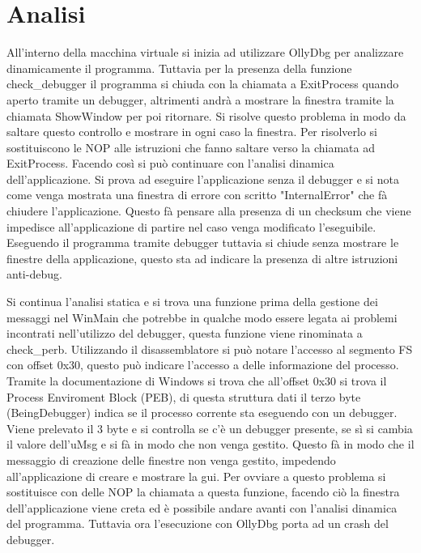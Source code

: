 \documentclass[a4paper,10pt]{article}
\begin{document}
\section{Analisi}
All'interno della macchina virtuale si inizia ad utilizzare OllyDbg per analizzare dinamicamente il programma. Tuttavia per la presenza della funzione check\_debugger il programma si chiuda con la chiamata a ExitProcess quando aperto tramite un debugger, altrimenti andrà a mostrare la finestra tramite la chiamata ShowWindow per poi ritornare. Si risolve questo problema in modo da saltare questo controllo e mostrare in ogni caso la finestra. Per risolverlo si sostituiscono le NOP alle istruzioni che fanno saltare verso la chiamata ad ExitProcess.
 Facendo così si può continuare con l'analisi dinamica dell'applicazione. Si prova ad eseguire l'applicazione senza il debugger e si nota come venga mostrata una finestra di errore con scritto "InternalError" che fà chiudere l'applicazione. Questo fà pensare alla presenza di un checksum che viene impedisce all'applicazione di partire nel caso venga modificato l'eseguibile.  Eseguendo il programma tramite debugger tuttavia si chiude senza mostrare le finestre della applicazione, questo sta ad indicare la presenza di altre istruzioni anti-debug. 

Si continua l'analisi statica e si trova una funzione prima della gestione dei messaggi nel WinMain che potrebbe in qualche modo essere legata ai problemi incontrati nell'utilizzo del debugger, questa funzione viene rinominata a check\_perb. Utilizzando il disassemblatore si può notare l'accesso al segmento FS con offset 0x30, questo può indicare l'accesso a delle informazione del processo. Tramite la documentazione di Windows si trova che all'offset 0x30 si trova il Process Enviroment Block (PEB), di questa struttura dati il terzo byte (BeingDebugger) indica se il processo corrente sta eseguendo con un debugger. Viene prelevato il 3 byte e si controlla se c'è un debugger presente, se sì si cambia il valore dell'uMsg e si fà in modo che non venga gestito. Questo fà in modo che il messaggio di creazione delle finestre non venga gestito, impedendo all'applicazione di creare e mostrare la gui. Per ovviare a questo problema si sostituisce con delle NOP la chiamata a questa funzione, facendo ciò la finestra dell'applicazione viene creta ed è possibile andare avanti con l'analisi dinamica del programma. Tuttavia ora l'esecuzione con OllyDbg porta ad un crash del debugger.
\end{document}
